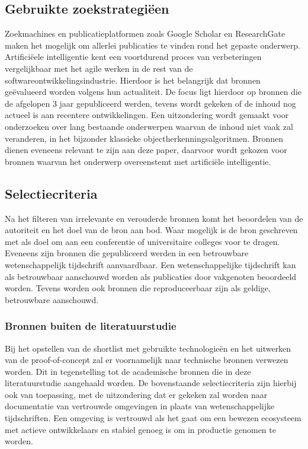 \subsection{Gebruikte zoekstrategiëen}
\label{subsec:zoekstrategieen}
Zoekmachines en publicatieplatformen zoals Google Scholar en ResearchGate maken het mogelijk om allerlei publicaties te vinden rond het gepaste onderwerp.
Artifici\"eele intelligentie kent een voortdurend proces van verbeteringen vergelijkbaar met het agile werken in de rest van de softwareontwikkelingsindustrie.
Hierdoor is het belangrijk dat bronnen ge\"evalueerd worden volgens hun actualiteit.
De focus ligt hierdoor op bronnen die de afgelopen 3 jaar gepubliceerd werden, tevens wordt gekeken of de inhoud nog actueel is aan recentere ontwikkelingen.
Een uitzondering wordt gemaakt voor onderzoeken over lang bestaande onderwerpen waarvan de inhoud niet vaak zal veranderen, in het bijzonder klassieke objectherkenningsalgoritmen.
Bronnen dienen eveneens relevant te zijn aan deze paper, daarvoor wordt gekozen voor bronnen waarvan het onderwerp overeenstemt met artifici\"ele intelligentie.

\subsection{Selectiecriteria}
\label{subsec:selectiecriteria}
Na het filteren van irrelevante en verouderde bronnen komt het beoordelen van de autoriteit en het doel van de bron aan bod.
Waar mogelijk is de bron geschreven met als doel om aan een conferentie of universitaire colleges voor te dragen.
Eveneens zijn bronnen die gepubliceerd werden in een betrouwbare wetenschappelijk tijdschrift aanvaardbaar.
Een wetenschappelijke tijdschrift kan als betrouwbaar aanschouwd worden als publicaties door vakgenoten beoordeeld worden.
Tevens worden ook bronnen die reproduceerbaar zijn als geldige, betrouwbare aanschouwd.

\subsubsection{Bronnen buiten de literatuurstudie}
Bij het opstellen van de shortlist met gebruikte technologie\"en en het uitwerken van de proof-of-concept zal er voornamelijk naar technische bronnen verwezen worden.
Dit in tegenstelling tot de academische bronnen die in deze literatuurstudie aangehaald worden.
De bovenstaande selectiecriteria zijn hierbij ook van toepassing, met de uitzondering dat er gekeken zal worden naar documentatie van vertrouwde omgevingen in plaats van wetenschappelijke tijdschriften.
Een omgeving is vertrouwd als het gaat om een bewezen ecosysteem met actieve ontwikkelaars en stabiel genoeg is om in productie genomen te worden.

